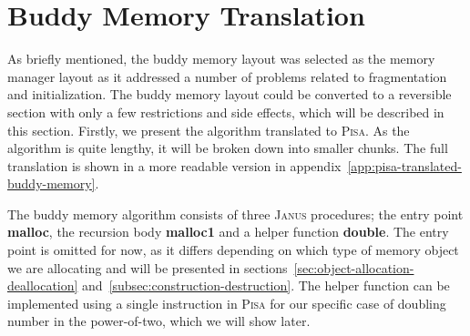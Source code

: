\section{Buddy Memory Translation}
\label{sec:buddy-memory-translation}
As briefly mentioned, the buddy memory layout was selected as the memory manager layout as it addressed a number of problems related to fragmentation and initialization. The buddy memory layout could be converted to a reversible section with only a few restrictions and side effects, which will be described in this section. Firstly, we present the algorithm translated to \textsc{Pisa}. As the algorithm is quite lengthy, it will be broken down into smaller chunks. The full translation is shown in a more readable version in appendix~\ref{app:pisa-translated-buddy-memory}.

The buddy memory algorithm consists of three \textsc{Janus} procedures; the entry point \textbf{malloc}, the recursion body \textbf{malloc1} and a helper function \textbf{double}. The entry point is omitted for now, as it differs depending on which type of memory object we are allocating and will be presented in sections~\ref{sec:object-allocation-deallocation} and~\ref{subsec:construction-destruction}. The helper function can be implemented using a single instruction in \textsc{Pisa} for our specific case of doubling number in the power-of-two, which we will show later. 

